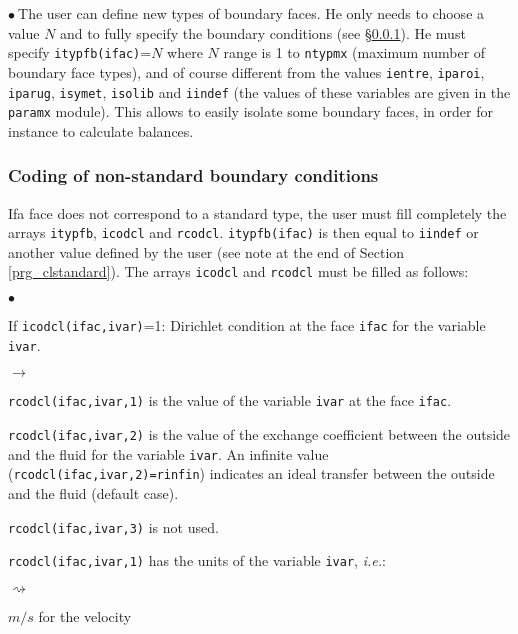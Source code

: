 {{{\noindent
$\bullet\ $The user can define new types of boundary faces. He only needs to
choose a value $N$ and to fully specify the boundary conditions (see
\S\ref{prg_clnonstandard}). He must specify
\texttt{itypfb(ifac)}=$N$ where $N$ range is 1 to
\texttt{ntypmx} (maximum number of boundary face types), and of
course different from the values \texttt{ientre}, \texttt{iparoi},
\texttt{iparug}, \texttt{isymet}, \texttt{isolib} and \texttt{iindef} (the values
of these variables are given in the \texttt{paramx} module). This allows to
easily isolate some boundary faces, in order for instance to calculate balances.

\subsubsection{Coding of non-standard boundary conditions}
\label{prg_clnonstandard}%
Ifa face does not correspond to a standard type, the user
must fill completely the arrays \texttt{itypfb}, \texttt{icodcl} and
\texttt{rcodcl}. \texttt{itypfb(ifac)} is then equal to \texttt{iindef}
or another value defined by the user (see note at the end of Section
\ref{prg_clstandard}). The arrays \texttt{icodcl} and \texttt{rcodcl}
must be filled as follows:

\begin{list}{$\bullet$}{}
\item If \texttt{icodcl(ifac,ivar)}=1: Dirichlet condition at the face
      \texttt{ifac} for the variable \texttt{ivar}.

\begin{list}{$\rightarrow$}{}
\item \texttt{rcodcl(ifac,ivar,1)} is the value of the variable \texttt{ivar}
      at the face \texttt{ifac}.

\item \texttt{rcodcl(ifac,ivar,2)} is the value of the exchange coefficient
      between the outside and the fluid for the variable \texttt{ivar}. An
      infinite value (\texttt{rcodcl(ifac,ivar,2)=rinfin}) indicates an
      ideal transfer between the outside and the fluid (default case).

\item \texttt{rcodcl(ifac,ivar,3)} is not used.

\item \texttt{rcodcl(ifac,ivar,1)} has the units of the variable
      \texttt{ivar}, {\em i.e.}:
\begin{list}{$\rightsquigarrow$}{}
\item $m/s$ for the velocity


\end{list}
\end{list}
\end{list}}}}
